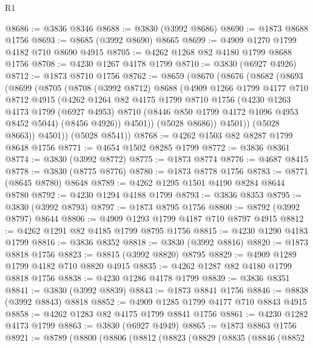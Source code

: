 \begin{lexlean}{R1}
\begin{coremodule}
@8686 := @3836 @8346
@8688 := @3830 (@3992 @8686)
@8690 := @1873 @8688 @1756
@8693 := @8685 (@3992 @8690) @8665
@8699 := @4909 @1270 @1799 @4182 @710 @8690 @4915
@8705 := @4262 @1268 @82 @4180 @1799 @8688 @1756
@8708 := @4230 @1267 @4178 @1799
@8710 := @3830 (@6927 @4926)
@8712 := @1873 @8710 @1756
@8762 := @8659
    (@8670
      (@8676
        (@8682
          (@8693
            (@8699
              (@8705
                (@8708
                  (@3992 @8712)
                  @8688
                  (@4909
                    @1266
                    @1799
                    @4177
                    @710
                    @8712
                    @4915
                    (@4262
                      @1264
                      @82
                      @4175
                      @1799
                      @8710
                      @1756
                      (@4230
                        @1263
                        @4173
                        @1799
                        (@6927 @4953)
                        @8710
                        (@8446 @850 @1799 @4172 @1096 @4953 @8452 @5044)
                        (@8456 @4926))
                      @4501))
                  (@5028 @8686))
                @4501))
            (@5028 @8663))
          @4501))
      (@5028 @8541))
@8768 := @4262 @1503 @82 @8287 @1799 @8648 @1756
@8771 := @4654 @1502 @8285 @1799
@8772 := @3836 @8361
@8774 := @3830 (@3992 @8772)
@8775 := @1873 @8774
@8776 := @4687 @8415
@8778 := @3830 (@8775 @8776)
@8780 := @1873 @8778 @1756
@8783 := @8771 (@8645 @8780) @8648
@8789 := @4262 @1295 @1501 @4190 @8284 @8644 @8780
@8792 := @4230 @1294 @4188 @1799
@8793 := @3836 @8353
@8795 := @3830 (@3992 @8793)
@8797 := @1873 @8795 @1756
@8800 := @8792 (@3992 @8797) @8644
@8806 := @4909 @1293 @1799 @4187 @710 @8797 @4915
@8812 := @4262 @1291 @82 @4185 @1799 @8795 @1756
@8815 := @4230 @1290 @4183 @1799
@8816 := @3836 @8352
@8818 := @3830 (@3992 @8816)
@8820 := @1873 @8818 @1756
@8823 := @8815 (@3992 @8820) @8795
@8829 := @4909 @1289 @1799 @4182 @710 @8820 @4915
@8835 := @4262 @1287 @82 @4180 @1799 @8818 @1756
@8838 := @4230 @1286 @4178 @1799
@8839 := @3836 @8351
@8841 := @3830 (@3992 @8839)
@8843 := @1873 @8841 @1756
@8846 := @8838 (@3992 @8843) @8818
@8852 := @4909 @1285 @1799 @4177 @710 @8843 @4915
@8858 := @4262 @1283 @82 @4175 @1799 @8841 @1756
@8861 := @4230 @1282 @4173 @1799
@8863 := @3830 (@6927 @4949)
@8865 := @1873 @8863 @1756
@8921 := @8789
    (@8800
      (@8806
        (@8812
          (@8823
            (@8829
              (@8835
                (@8846
                  (@8852

\end{coremodule}
\end{lexlean}
